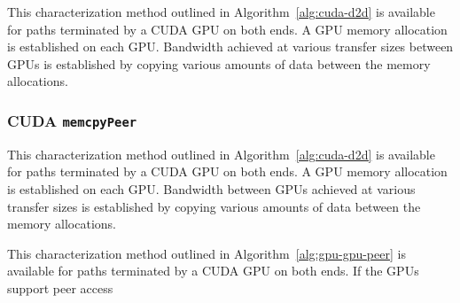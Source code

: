 This characterization method outlined in Algorithm~\ref{alg:cuda-d2d} is available for paths terminated by a CUDA GPU on both ends.
A GPU memory allocation is established on each GPU.
Bandwidth achieved at various transfer sizes between GPUs is established by copying various amounts of data between the memory allocations.


\subsubsection{CUDA \texttt{memcpyPeer}}

This characterization method outlined in Algorithm~\ref{alg:cuda-d2d} is available for paths terminated by a CUDA GPU on both ends.
A GPU memory allocation is established on each GPU.
Bandwidth between GPUs achieved at various transfer sizes is established by copying various amounts of data between the memory allocations.



This characterization method outlined in Algorithm~\ref{alg:gpu-gpu-peer} is available for paths terminated by a CUDA GPU on both ends.
If the GPUs support peer access

